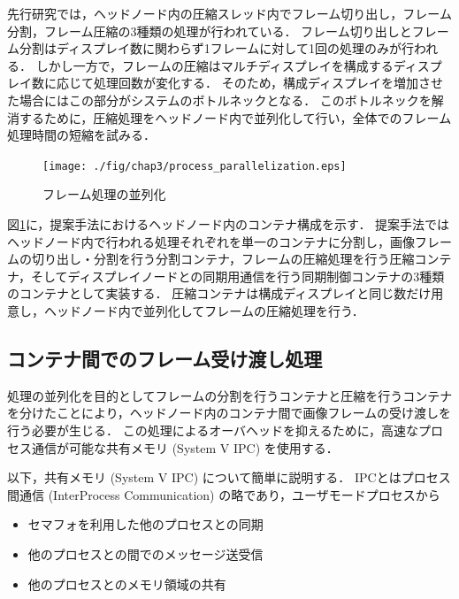 先行研究では，ヘッドノード内の圧縮スレッド内でフレーム切り出し，フレーム分割，フレーム圧縮の3種類の処理が行われている．
フレーム切り出しとフレーム分割はディスプレイ数に関わらず1フレームに対して1回の処理のみが行われる．
しかし一方で，フレームの圧縮はマルチディスプレイを構成するディスプレイ数に応じて処理回数が変化する．
そのため，構成ディスプレイを増加させた場合にはこの部分がシステムのボトルネックとなる．
このボトルネックを解消するために，圧縮処理をヘッドノード内で並列化して行い，全体でのフレーム処理時間の短縮を試みる．

\begin{figure}[H]
    \hspace*{\fill}
    \texttt{[image: ./fig/chap3/process\_parallelization.eps]}
    \hspace*{\fill}
    \caption{フレーム処理の並列化}
    \label{process_para}
\end{figure}

図\ref{process_para}に，提案手法におけるヘッドノード内のコンテナ構成を示す．
提案手法ではヘッドノード内で行われる処理それぞれを単一のコンテナに分割し，画像フレームの切り出し・分割を行う分割コンテナ，フレームの圧縮処理を行う圧縮コンテナ，そしてディスプレイノードとの同期用通信を行う同期制御コンテナの3種類のコンテナとして実装する．
圧縮コンテナは構成ディスプレイと同じ数だけ用意し，ヘッドノード内で並列化してフレームの圧縮処理を行う．

\subsection*{コンテナ間でのフレーム受け渡し処理}

処理の並列化を目的としてフレームの分割を行うコンテナと圧縮を行うコンテナを分けたことにより，ヘッドノード内のコンテナ間で画像フレームの受け渡しを行う必要が生じる．
この処理によるオーバヘッドを抑えるために，高速なプロセス通信が可能な共有メモリ (System V IPC) \cite{kerrisk2010linux,linux_kernel}を使用する．

以下，共有メモリ (System V IPC) について簡単に説明する．
IPCとはプロセス間通信 (InterProcess Communication) の略であり，ユーザモードプロセスから

\begin{itemize}
    \item セマフォを利用した他のプロセスとの同期
    \item 他のプロセスとの間でのメッセージ送受信
    \item 他のプロセスとのメモリ領域の共有
\end{itemize}

